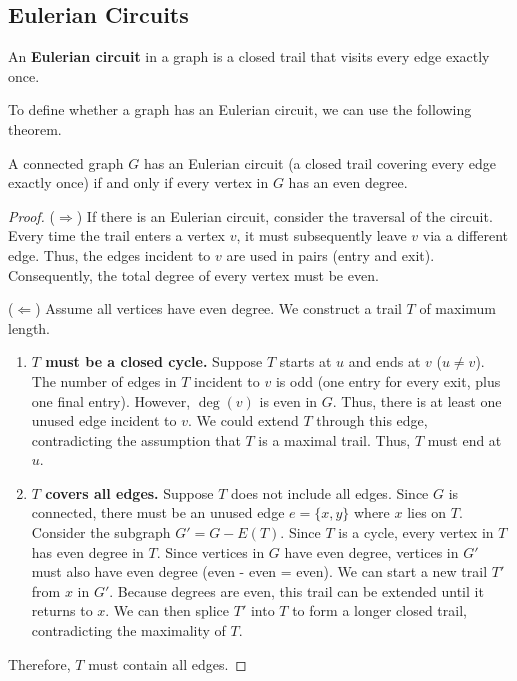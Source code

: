 \subsection{Eulerian Circuits}

\begin{definition}
An \textbf{Eulerian circuit} in a graph is a closed trail that visits every edge exactly once.
\end{definition}

To define whether a graph has an Eulerian circuit, we can use the following theorem.

\begin{theorem}
A connected graph $G$ has an Eulerian circuit (a closed trail covering every edge exactly once) if and only if every vertex in $G$ has an even degree.
\end{theorem}

\begin{proof}
($\Rightarrow$) If there is an Eulerian circuit, consider the traversal of the circuit. Every time the trail enters a vertex $v$, it must subsequently leave $v$ via a different edge. Thus, the edges incident to $v$ are used in pairs (entry and exit). Consequently, the total degree of every vertex must be even.

($\Leftarrow$) Assume all vertices have even degree. We construct a trail $T$ of maximum length.
\begin{enumerate}
    \item \textbf{$T$ must be a closed cycle.} Suppose $T$ starts at $u$ and ends at $v$ ($u \neq v$). The number of edges in $T$ incident to $v$ is odd (one entry for every exit, plus one final entry). However, $\deg(v)$ is even in $G$. Thus, there is at least one unused edge incident to $v$. We could extend $T$ through this edge, contradicting the assumption that $T$ is a maximal trail. Thus, $T$ must end at $u$.
    \item \textbf{$T$ covers all edges.} Suppose $T$ does not include all edges. Since $G$ is connected, there must be an unused edge $e=\{x, y\}$ where $x$ lies on $T$. Consider the subgraph $G' = G - E(T)$. Since $T$ is a cycle, every vertex in $T$ has even degree in $T$. Since vertices in $G$ have even degree, vertices in $G'$ must also have even degree (even - even = even).
    We can start a new trail $T'$ from $x$ in $G'$. Because degrees are even, this trail can be extended until it returns to $x$. We can then splice $T'$ into $T$ to form a longer closed trail, contradicting the maximality of $T$.
\end{enumerate}
Therefore, $T$ must contain all edges.
\end{proof}

